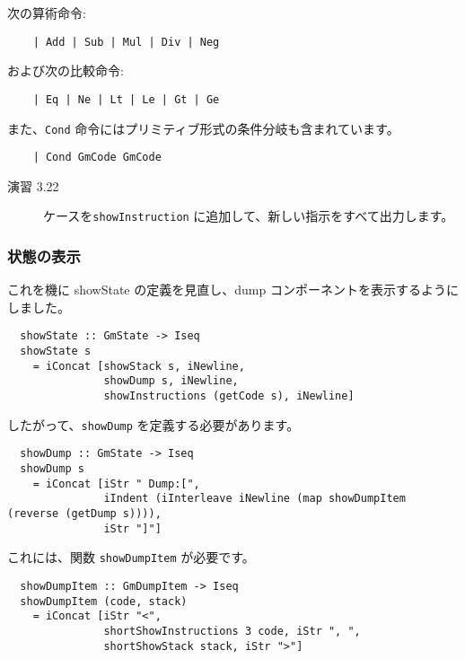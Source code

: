\documentclass{jarticle}
\begin{document}
次の算術命令:

\begin{verbatim}
    | Add | Sub | Mul | Div | Neg
\end{verbatim}

および次の比較命令:

\begin{verbatim}
    | Eq | Ne | Lt | Le | Gt | Ge
\end{verbatim}

また、\texttt{Cond} 命令にはプリミティブ形式の条件分岐も含まれています。

\begin{verbatim}
    | Cond GmCode GmCode
\end{verbatim}

\begin{description}
	\item[演習 3.22] ケースを\texttt{showInstruction} に追加して、新しい指示をすべて出力します。
\end{description}

\subsubsection{状態の表示}

これを機に showState の定義を見直し、dump コンポーネントを表示するようにしました。

\begin{verbatim}
  showState :: GmState -> Iseq
  showState s
    = iConcat [showStack s, iNewline,
               showDump s, iNewline,
               showInstructions (getCode s), iNewline]
\end{verbatim}

したがって、\texttt{showDump} を定義する必要があります。

\begin{verbatim}
  showDump :: GmState -> Iseq
  showDump s
    = iConcat [iStr " Dump:[",
               iIndent (iInterleave iNewline (map showDumpItem (reverse (getDump s)))),
               iStr "]"]
\end{verbatim}

これには、関数 \texttt{showDumpItem} が必要です。

\begin{verbatim}
  showDumpItem :: GmDumpItem -> Iseq
  showDumpItem (code, stack)
    = iConcat [iStr "<",
               shortShowInstructions 3 code, iStr ", ",
               shortShowStack stack, iStr ">"]
\end{verbatim}
\end{document}
